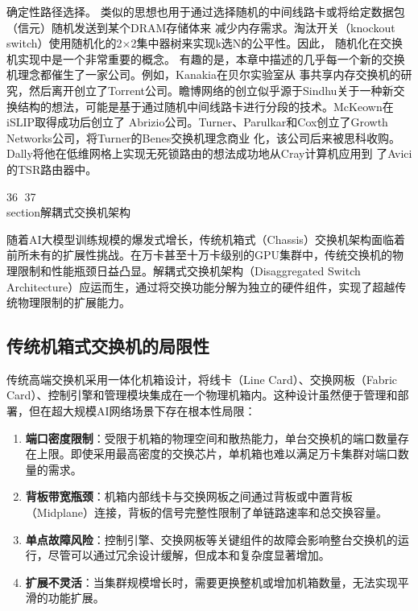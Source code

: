 确定性路径选择。
类似的思想也用于通过选择随机的中间线路卡或将给定数据包（信元）随机发送到某个DRAM存储体来
减少内存需求。淘汰开关（knockout switch）使用随机化的2×2集中器树来实现k选N的公平性。因此，
随机化在交换机实现中是一个非常重要的概念。
有趣的是，本章中描述的几乎每一个新的交换机理念都催生了一家公司。例如，Kanakia在贝尔实验室从
事共享内存交换机的研究，然后离开创立了Torrent公司。瞻博网络的创立似乎源于Sindhu关于一种新交
换结构的想法，可能是基于通过随机中间线路卡进行分段的技术。McKeown在iSLIP取得成功后创立了
Abrizio公司。Turner、Parulkar和Cox创立了Growth Networks公司，将Turner的Benes交换机理念商业
化，该公司后来被思科收购。Dally将他在低维网格上实现无死锁路由的想法成功地从Cray计算机应用到
了Avici的TSR路由器中。



                                                                    36
37

\\section{解耦式交换机架构}

随着AI大模型训练规模的爆发式增长，传统机箱式（Chassis）交换机架构面临着前所未有的扩展性挑战。在万卡甚至十万卡级别的GPU集群中，传统交换机的物理限制和性能瓶颈日益凸显。解耦式交换机架构（Disaggregated Switch Architecture）应运而生，通过将交换功能分解为独立的硬件组件，实现了超越传统物理限制的扩展能力。

\subsection{传统机箱式交换机的局限性}

传统高端交换机采用一体化机箱设计，将线卡（Line Card）、交换网板（Fabric Card）、控制引擎和管理模块集成在一个物理机箱内。这种设计虽然便于管理和部署，但在超大规模AI网络场景下存在根本性局限：

\begin{enumerate}
    \item \textbf{端口密度限制}：受限于机箱的物理空间和散热能力，单台交换机的端口数量存在上限。即使采用最高密度的交换芯片，单机箱也难以满足万卡集群对端口数量的需求。
    \item \textbf{背板带宽瓶颈}：机箱内部线卡与交换网板之间通过背板或中置背板（Midplane）连接，背板的信号完整性限制了单链路速率和总交换容量。
    \item \textbf{单点故障风险}：控制引擎、交换网板等关键组件的故障会影响整台交换机的运行，尽管可以通过冗余设计缓解，但成本和复杂度显著增加。
    \item \textbf{扩展不灵活}：当集群规模增长时，需要更换整机或增加机箱数量，无法实现平滑的功能扩展。
\end{enumerate}

